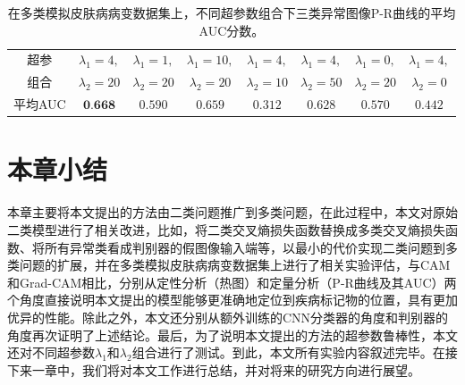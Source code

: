 \begin{table}[H]
	\centering
	\caption[不同超参数组合下三类异常图像P-R曲线的平均AUC分数]{在多类模拟皮肤病病变数据集上，不同超参数组合下三类异常图像P-R曲线的平均AUC分数。}
	\label{tab:simulated_skin_diff_parameters}
		\begin{tabular}{c|c|c|c|c|c|c|c}
			\toprule[2pt]
			
			超参& $\lambda_{1}=4,$ & $\lambda_{1}=1,$& $\lambda_{1}=10,$&
			$\lambda_{1}=4,$ & $\lambda_{1}=4,$ &
			$\lambda_{1}=0,$ &
			$\lambda_{1}=4,$\\
			组合		  & 
			$\lambda_{2}=20$ & $\lambda_{2}=20$ &
			$\lambda_{2}=20$ & $\lambda_{2}=10$ & $\lambda_{2}=50$ &
			$\lambda_{2}=20$&
			$\lambda_{2}=0$ \\
			\midrule[2pt]



			平均AUC	& $\textbf{0.668}$ &	$0.590 $ & $0.659$ & $0.312$ & $0.628$& $0.570$ &	$0.442$ \\
			\bottomrule[2pt]
		\end{tabular}
\end{table}
\section{本章小结}
本章主要将本文提出的方法由二类问题推广到多类问题，在此过程中，本文对原始二类模型进行了相关改进，比如，将二类交叉熵损失函数替换成多类交叉熵损失函数、将所有异常类看成判别器的假图像输入端等，以最小的代价实现二类问题到多类问题的扩展，并在多类模拟皮肤病病变数据集上进行了相关实验评估，与CAM和Grad-CAM相比，分别从定性分析（热图）和定量分析（P-R曲线及其AUC）两个角度直接说明本文提出的模型能够更准确地定位到疾病标记物的位置，具有更加优异的性能。除此之外，本文还分别从额外训练的CNN分类器的角度和判别器的角度再次证明了上述结论。最后，为了说明本文提出的方法的超参数鲁棒性，本文还对不同超参数$\lambda_{1}$和$\lambda_{2}$组合进行了测试。到此，本文所有实验内容叙述完毕。在接下来一章中，我们将对本文工作进行总结，并对将来的研究方向进行展望。

